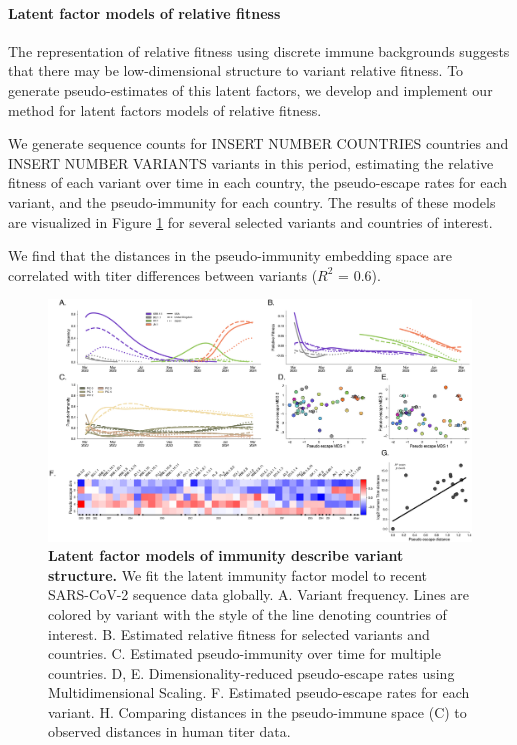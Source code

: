 \documentclass[12pt,oneside,letterpaper]{article}
\begin{document}
\paragraph{Latent factor models of relative fitness}

The representation of relative fitness using discrete immune backgrounds suggests that there may be low-dimensional structure to variant relative fitness.
To generate pseudo-estimates of this latent factors, we develop and implement our method for latent factors models of relative fitness.

We generate sequence counts for INSERT NUMBER COUNTRIES countries and INSERT NUMBER VARIANTS variants in this period, estimating the relative fitness of each variant over time in each country, the pseudo-escape rates for each variant, and the pseudo-immunity for each country.
The results of these models are visualized in Figure \ref{fig:latent_immune} for several selected variants and countries of interest.

We find that the distances in the pseudo-immunity embedding space are correlated with titer differences between variants ($R^2$ = 0.6).

\begin{figure}[h]
    \centering
    \includegraphics[width=0.8\linewidth]{./figures/latent_immune.png}
    \caption{\textbf{Latent factor models of immunity describe variant structure.}
        We fit the latent immunity factor model to recent SARS-CoV-2 sequence data globally.
        A. Variant frequency. Lines are colored by variant with the style of the line denoting countries of interest.
        B. Estimated relative fitness for selected variants and countries.
        C. Estimated pseudo-immunity over time for multiple countries.
        D, E. Dimensionality-reduced pseudo-escape rates using Multidimensional Scaling.
        F. Estimated pseudo-escape rates for each variant.
        H. Comparing distances in the pseudo-immune space (C) to observed distances in human titer data.
    }
\label{fig:latent_immune}
\end{figure}
\end{document}
